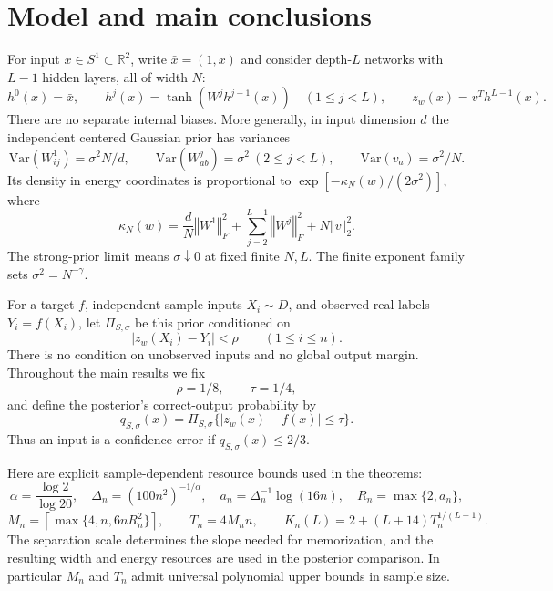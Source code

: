 \documentclass[11pt]{article}
\theoremstyle{remark}\newtheorem{remark}[theorem]{Remark}
\newcommand{\R}{\mathbb R}\newcommand{\E}{\mathbb E}\newcommand{\Prb}{\mathbb P}
\newcommand{\norm}[1]{\left\Vert#1\right\Vert}
\begin{document}
\section{Model and main conclusions}\label{sec:main}
For input $x\in S^1\subset\R^2$, write $\bar x=(1,x)$ and consider
depth-$L$ networks with $L-1$ hidden layers, all of width $N$:
\[
 h^0(x)=\bar x,\qquad
 h^j(x)=\tanh(W^jh^{j-1}(x))\quad(1\le j<L),\qquad
 z_w(x)=v^Th^{L-1}(x).
\]
There are no separate internal biases. More generally, in input dimension
$d$ the independent centered Gaussian prior has variances
\begin{equation}\label{eq:scales}
 \mathrm{Var}(W^1_{ij})=\sigma^2N/d,\qquad
 \mathrm{Var}(W^j_{ab})=\sigma^2\ (2\le j<L),\qquad
 \mathrm{Var}(v_a)=\sigma^2/N.
\end{equation}
Its density in energy coordinates is proportional to
$\exp[-\kappa_N(w)/(2\sigma^2)]$, where
\begin{equation}\label{eq:energy}
 \kappa_N(w)=\frac dN\norm{W^1}_F^2+
 \sum_{j=2}^{L-1}\norm{W^j}_F^2+N\norm v_2^2.
\end{equation}
The strong-prior limit means $\sigma\downarrow0$ at fixed finite $N,L$.
The finite exponent family sets $\sigma^2=N^{-\gamma}$.

For a target $f$, independent sample inputs $X_i\sim D$, and observed
real labels $Y_i=f(X_i)$, let $\Pi_{S,\sigma}$ be this prior conditioned on
\begin{equation}\label{eq:training}
 |z_w(X_i)-Y_i|<\rho\qquad(1\le i\le n).
\end{equation}
There is no condition on unobserved inputs and no global output margin.
Throughout the main results we fix
\[
 \rho=1/8,\qquad \tau=1/4,
\]
and define the posterior's correct-output probability by
\[
 q_{S,\sigma}(x)=\Pi_{S,\sigma}\{|z_w(x)-f(x)|\le\tau\}.
\]
Thus an input is a confidence error if $q_{S,\sigma}(x)\le2/3$.

Here are explicit sample-dependent resource bounds used in the theorems:
\begin{equation}\label{eq:resources}
 \alpha=\frac{\log2}{\log20},\quad
 \Delta_n=(100n^2)^{-1/\alpha},\quad
 a_n=\Delta_n^{-1}\log(16n),\quad R_n=\max\{2,a_n\},
\end{equation}
\begin{equation}\label{eq:MT}
 M_n=\left\lceil\max\{4,n,6nR_n^2\}\right\rceil,
 \qquad T_n=4M_n n,\qquad
 K_n(L)=2+(L+14)T_n^{1/(L-1)}.
\end{equation}
The separation scale determines the slope needed for memorization, and
the resulting width and energy resources are used in the posterior
comparison. In particular $M_n$ and $T_n$ admit universal polynomial
upper bounds in sample size.
\end{document}
